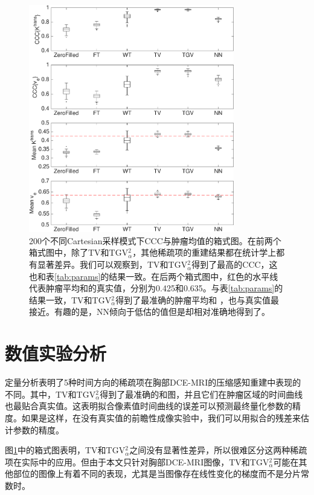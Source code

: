 \begin{figure}[htbp]
\centerline{
    \includegraphics[width=0.8\textwidth]{img/qetsr/figure7.eps}
}
\caption{
200个不同Cartesian采样模式下CCC与肿瘤均值的箱式图。在前两个箱式图中，除了TV和TGV$_{\alpha}^2$，其他稀疏项的重建结果都在统计学上都有显著差异。我们可以观察到，TV和TGV$_{\alpha}^2$得到了最高的CCC，这也和表\ref{tab:params}的结果一致。在后两个箱式图中，红色的水平线代表肿瘤平均\kt 和\Ve 的真实值，分别为0.425和0.635。与表\ref{tab:params}的结果一致，TV和TGV$_{\alpha}^2$得到了最准确的肿瘤平均\kt 和 \Ve，也与真实值最接近。有趣的是，NN倾向于低估\kt 的值但是却相对准确地得到了\Ve。
}
\label{fig:paramsbp}
\end{figure}

\section{数值实验分析}
定量分析表明了5种时间方向的稀疏项在胸部DCE-MRI的压缩感知重建中表现的不同。其中，TV和TGV$_{\alpha}^2$得到了最准确的\kt 和\Ve 图，并且它们在肿瘤区域的时间曲线也最贴合真实值。这表明拟合像素值时间曲线的误差可以预测最终量化参数的精度。如果是这样，在没有真实值的前瞻性成像实验中，我们可以用拟合的残差来估计参数的精度。

图\ref{fig:paramsbp}中的箱式图表明，TV和TGV$_{\alpha}^2$之间没有显著性差异，所以很难区分这两种稀疏项在实际中的应用。但由于本文只针对胸部DCE-MRI图像，TV和TGV$_{\alpha}^2$可能在其他部位的图像上有着不同的表现，尤其是当图像存在线性变化的梯度而不是分片常数时。

